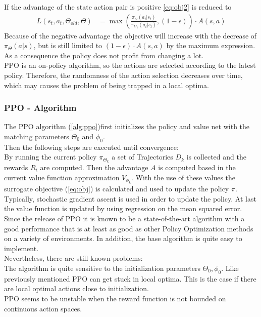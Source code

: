 If the advantage of the state action pair is positive \cref{eq:obj2} is reduced to 
\begin{align}
	L(s_t, a_t, \Theta_{old}, \Theta) &= \max (\frac{\pi_{\Theta}(a_t|s_t)}{\pi_{\Theta_k}(a_t|s_t)}, (1 - \epsilon)) \cdot A(s,a)
\end{align}
Because of the negative advantage the objective will increase with the decrease of $\pi_{\Theta} (a|s)$, 
but is still limited to $(1 - \epsilon) \cdot A(s,a)$ by the maximum expression.\\
As a consequence the policy does not profit from changing a lot.\\
PPO is an on-policy algorithm, so the actions are selected according to the latest policy. 
Therefore, the randomness of the action selection decreases over time, which may causes the problem of being trapped in a local optima.

\newpage
\subsubsection{PPO - Algorithm}
The PPO algorithm (\cref{alg:ppo})first initializes the policy and value net with the matching parameters $\Theta_0$ and $\phi_0$.\\
Then the following steps are executed until convergence:\\
By running the current policy $\pi_{\Theta_k}$ a set of Trajectories $D_k$ is collected and the rewards $R_t$ are computed. 
Then the advantage $A$ is computed based in the current value function approximation $V_{\phi_k}$. 
With the use of these values the surrogate objective (\cref{eq:obj}) is calculated and used to update the policy $\pi$. 
Typically, stochastic gradient ascent is used in order to update the policy. At last the value function is updated by using regression on the mean squared error.\\
\newline
Since the release of PPO it is known to be a state-of-the-art algorithm with a good performance that is at least as good as other 
Policy Optimization methods on a variety of environments. In addition, the base algorithm is quite easy to implement.\\
Nevertheless, there are still known problems:\\
The algorithm is quite sensitive to the initialization parameters $\Theta_0, \phi_0$. Like previously mentioned PPO can get stuck in local optima. 
This is the case if there are local optimal actions close to initialization.\\
PPO seems to be unstable when the reward function is not bounded on continuous action spaces. 


